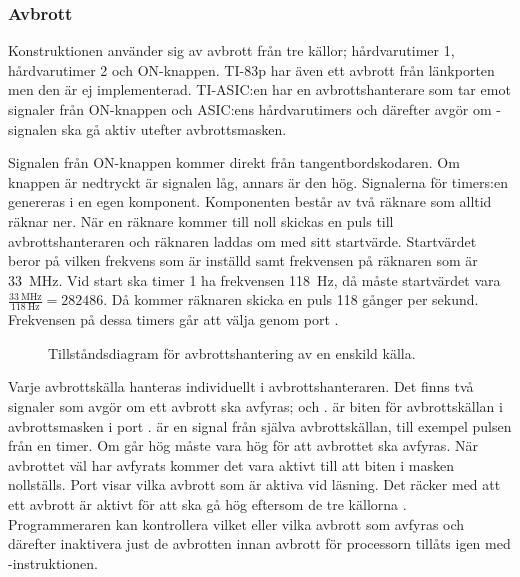 \documentclass[main.tex]{subfiles}
\begin{document}
\subsubsection{Avbrott}
Konstruktionen använder sig av avbrott från tre källor; hårdvarutimer 1,
hårdvarutimer 2 och ON-knappen. TI-83p har även ett avbrott från länkporten men
den är ej implementerad. TI-ASIC:en har en avbrottshanterare som tar emot
signaler från ON-knappen och ASIC:ens hårdvarutimers och därefter avgör om
-signalen ska gå aktiv utefter avbrottsmasken.

Signalen från ON-knappen kommer direkt från tangentbordskodaren. Om knappen är
nedtryckt är signalen låg, annars är den hög. Signalerna för timers:en
genereras i en egen komponent. Komponenten består av två räknare som alltid
räknar ner. När en räknare kommer till noll skickas en puls till
avbrottshanteraren och räknaren laddas om med sitt startvärde. Startvärdet
beror på vilken frekvens som är inställd samt frekvensen på räknaren som är
\SI{33}{\mega\hertz}. Vid start ska timer 1 ha frekvensen \SI{118}{\hertz}, då
måste startvärdet vara $\frac{\SI{33}{\mega\hertz}}{\SI{118}{\hertz}} =
282486$. Då kommer räknaren skicka en puls 118 gånger per sekund. Frekvensen på
dessa timers går att välja genom port .

\begin{SCfigure}
    \centering
    
    \caption{Tillståndsdiagram för avbrottshantering av en enskild källa.}
    \label{fig:prefix}
\end{SCfigure}

Varje avbrottskälla hanteras individuellt i avbrottshanteraren. Det finns två
signaler som avgör om ett avbrott ska avfyras;  och
.  är biten för avbrottskällan i avbrottsmasken i
port .  är en signal från själva avbrottskällan, till
exempel pulsen från en timer. Om  går hög måste 
vara hög för att avbrottet ska avfyras. När avbrottet väl har avfyrats kommer
det vara aktivt till att biten i masken nollställs. Port  visar vilka
avbrott som är aktiva vid läsning. Det räcker med att ett avbrott är aktivt för
att  ska gå hög eftersom de tre källorna . Programmeraren
kan kontrollera vilket eller vilka avbrott som avfyras och därefter inaktivera
just de avbrotten innan avbrott för processorn tillåts igen med
-instruktionen.
\end{document}
